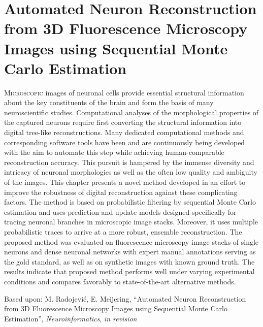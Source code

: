 %
%
\chpos{15mm}{8mm}
\chapter[Automated Neuron Reconstruction from 3D Fluorescence Microscopy Images using Sequential Monte Carlo Estimation]{Automated Neuron Reconstruction from 3D Fluorescence Microscopy Images using Sequential Monte Carlo Estimation}
\label{ch4:pnr}
{\small \lettrine{M}{icroscopic} images of neuronal cells provide essential structural information about the key constituents of the brain and form the basis of many neuroscientific studies. Computational analyses of the morphological properties of the captured neurons require first converting the structural information into digital tree-like reconstructions. Many dedicated computational methods and corresponding software tools have been and are continuously being developed with the aim to automate this step while achieving human-comparable reconstruction accuracy. This pursuit is hampered by the immense diversity and intricacy of neuronal morphologies as well as the often low quality and ambiguity of the images. This chapter presents a novel method developed in an effort to improve the robustness of digital reconstruction against these complicating factors. The method is based on probabilistic filtering by sequential Monte Carlo estimation and uses prediction and update models designed specifically for tracing neuronal branches in microscopic image stacks. Moreover, it uses multiple probabilistic traces to arrive at a more robust, ensemble reconstruction. The proposed method was evaluated on fluorescence microscopy image stacks of single neurons and dense neuronal networks with expert manual annotations serving as the gold standard, as well as on synthetic images with known ground truth. The results indicate that proposed method performs well under varying experimental conditions and compares favorably to state-of-the-art alternative methods.\par}
\vspace*{9em}
\begin{publish}
	Based upon: M. Radojevi\'{c}, E. Meijering, ``Automated Neuron Reconstruction from 3D Fluorescence Microscopy Images using Sequential Monte Carlo Estimation'', \textit{Neuroinformatics}, \textit{in revision}%
\end{publish}
